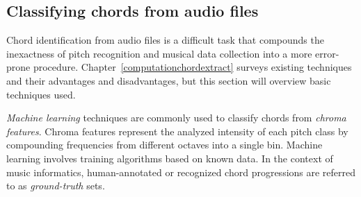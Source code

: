 \subsection{Classifying chords from audio files}

Chord identification from audio files is a difficult task that compounds the inexactness of pitch recognition and musical data collection into a more error-prone procedure. Chapter~\ref{computationchordextract} surveys existing techniques and their advantages and disadvantages, but this section will overview basic techniques used.

\textit{Machine learning} techniques are commonly used to classify chords from \textit{chroma features}. Chroma features represent the analyzed intensity of each pitch class by compounding frequencies from different octaves into a single bin. Machine learning involves training algorithms based on known data. In the context of music informatics, human-annotated or recognized chord progressions are referred to as \textit{ground-truth} sets\cite{BurgoyneEtAl_2011_AnExpeGrouSet}.